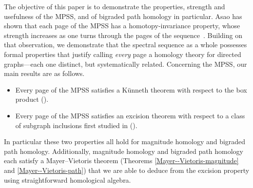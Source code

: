 \documentclass[a4paper, 11 pt, oneside, reqno]{amsart}
\numberwithin{lemma}{section}
\theoremstyle{definition}
\begin{document}
The objective of this paper is to demonstrate the properties, strength and usefulness of the MPSS, and of bigraded path homology in particular. Asao has shown that each page of the MPSS has a homotopy-invariance property, whose strength increases as one turns through the pages of the sequence~\cite{Asao-filtered}. Building on that observation, we demonstrate that the spectral sequence as a whole possesses formal properties that justify calling \emph{every} page a homology theory for directed graphs---each one distinct, but systematically related. Concerning the MPSS, our main results are as follows.
    \begin{itemize}
    \item[(A)] Every page of the MPSS satisfies a K\"unneth theorem with respect to the box product ().
    \item[(B)] Every page of the MPSS satisfies an excision theorem with respect to a class of subgraph inclusions first studied in \cite{CDKOSW} ().
\end{itemize}
In particular these two properties all hold for magnitude homology and bigraded path homology. Additionally, magnitude homology and bigraded path homology each satisfy a Mayer--Vietoris theorem (Theorems \ref{Mayer--Vietoris-magnitude} and \ref{Mayer--Vietoris-path}) that we are able to deduce from the excision property using straightforward homological algebra.
\end{document}
